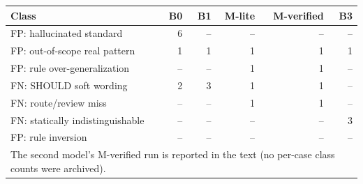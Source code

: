\begin{tabular}{lrrrrr}
\toprule
Class & B0 & B1 & M-lite & M-verified & B3 \\
\midrule
FP: hallucinated standard & 6 & -- & -- & -- & -- \\
FP: out-of-scope real pattern & 1 & 1 & 1 & 1 & 1 \\
FP: rule over-generalization & -- & -- & 1 & 1 & -- \\
FN: SHOULD soft wording & 2 & 3 & 1 & 1 & -- \\
FN: route/review miss & -- & -- & 1 & 1 & -- \\
FN: statically indistinguishable & -- & -- & -- & -- & 3 \\
FP: rule inversion & -- & -- & -- & -- & -- \\
\midrule
\multicolumn{6}{l}{\footnotesize The second model's M-verified run is reported in the text (no per-case class counts were archived).} \\
\bottomrule
\end{tabular}
